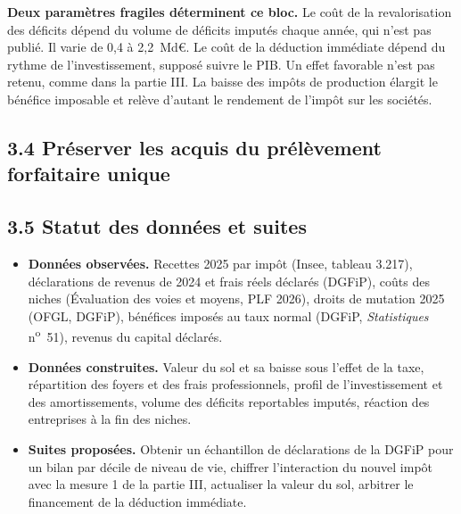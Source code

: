 



\textbf{Deux paramètres fragiles déterminent ce bloc.} Le coût de la revalorisation des déficits dépend du volume de
déficits imputés chaque année, qui n'est pas publié. Il varie de 0,4 à 2,2~Md€. Le coût de la déduction immédiate dépend
du rythme de l'investissement, supposé suivre le PIB. Un effet favorable n'est pas retenu, comme dans la partie III. La
baisse des impôts de production élargit le bénéfice imposable et relève d'autant le rendement de l'impôt sur les sociétés.

\subsection{3.4 Préserver les acquis du prélèvement forfaitaire unique}



\PFUFIN



\subsection{3.5 Statut des données et suites}

\begin{itemize}[leftmargin=12pt,itemsep=1pt,topsep=1pt]
\item \textbf{Données observées.} Recettes 2025 par impôt (Insee, tableau 3.217), déclarations de revenus de 2024 et
frais réels déclarés (DGFiP), coûts des niches (Évaluation des voies et moyens, PLF 2026), droits de mutation 2025 (OFGL,
DGFiP), bénéfices imposés au taux normal (DGFiP, \emph{Statistiques} n\textsuperscript{o}~51), revenus du capital déclarés.
\item \textbf{Données construites.} Valeur du sol et sa baisse sous l'effet de la taxe, répartition des foyers et des
frais professionnels, profil de l'investissement et des amortissements, volume des déficits reportables imputés,
réaction des entreprises à la fin des niches.
\item \textbf{Suites proposées.} Obtenir un échantillon de déclarations de la DGFiP pour un bilan par décile de niveau de
vie, chiffrer l'interaction du nouvel impôt avec la mesure 1 de la partie III, actualiser la valeur du sol, arbitrer le
financement de la déduction immédiate.
\end{itemize}

